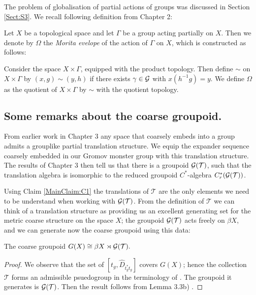 \begin{example}
The problem of globalisation of partial actions of groups was discussed in Section \ref{Sect:S3}. We recall following definition from Chapter 2:
\begin{definition}
Let $X$ be a topological space and let $\Gamma$ be a group acting partially on $X$. Then we denote by $\Omega$ the \textit{Morita evelope} of the action of $\Gamma$ on $X$, which is constructed as follows:

Consider the space $X\times \Gamma$, equipped with the product topology. Then define $\sim$ on $X\times \Gamma$ by $(x,g)\sim (y,h)$ if there exists $\gamma \in \mathcal{G}$ with $x(h^{-1}g)=y$. We define $\Omega$ as the quotient of $X\times \Gamma$ by $\sim$ with the quotient topology. 
\end{definition}

\subsection{Some remarks about the coarse groupoid.}

From earlier work in Chapter 3 any space that coarsely embeds into a group admits a grouplike partial translation structure. We equip the expander sequence coarsely embedded in our Gromov monster group with this translation structure. The results of Chapter 3 then tell us that there is a groupoid $\mathcal{G}(\mathcal{T})$, such that the translation algebra is isomorphic to the reduced groupoid  $C^{*}$-algebra $C^{*}_{r}(\mathcal{G}(\mathcal{T}))$. 

Using Claim \ref{MainClaim:C1} the translations of $\mathcal{T}$ are the only elements we need to be understand when working with $\mathcal{G}(\mathcal{T})$. From the definition of $\mathcal{T}$ we can think of a translation structure as providing us an excellent generating set for the metric coarse structure on the space $X$; the groupoid $\mathcal{G}(\mathcal{T})$ acts freely on $\beta X$, and we can generate now the coarse groupoid using this data:

\begin{lemma}\label{Lem:CG}
The coarse groupoid $G(X) \cong \beta X \rtimes \mathcal{G}(\mathcal{T}).$
\end{lemma}
\begin{proof}
We observe that the set of $[t_{g},\widehat{D}_{t_{g}^{*}t_{g}}]$ covers $G(X)$; hence the collection $\mathcal{T}$ forms an admissible psuedogroup in the terminology of \cite{MR1905840}. The groupoid it generates is $\mathcal{G}(\mathcal{T})$. Then the result follows from Lemma 3.3b) \cite{MR1905840}.
\end{proof}


\end{example}
